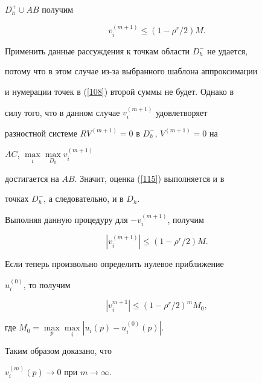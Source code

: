 \begin{pf}
$D_h^+\cup AB$ получим 


\begin{equation}\label{115}


v_{i}^{(m+1)} \leq (1 - \rho^r/2)M.


\end{equation}





Применить данные рассуждения к точкам области $D_h^-$ не удается,


потому что в этом случае из-за выбранного шаблона аппроксимации


и нумерации точек в (\ref{108}) второй суммы не будет. Однако в


силу того, что в данном случае $v_i^{(m+1)}$ удовлетворяет


разностной системе $RV^{(m+1)} = 0$ в $D_h^-$, $V^{(m+1)} = 0$ на


$AC$, $\max\limits_{i}\max\limits_{D_h} v_i^{(m+1)}$


достигается на $AB$. Значит, оценка (\ref{115}) выполняется и в


точках $D_h^-$, а следовательно, и в $D_h$.





Выполняя данную процедуру для $-v_i^{(m+1)}$, получим


$$


|v_{i}^{(m+1)}| \leq (1 - \rho^r/2)M.


$$





Если теперь произвольно определить нулевое приближение 


$u_i^{(0)}$, то получим


$$


|v_{i}^{m+1}| \leq (1 - \rho^r/2)^m M_0,


$$


где $M_0 = \max\limits_p \max\limits_i |u_i(p) - u_i^{(0)}(p)|$.





Таким образом доказано, что 


$v_i^{(m)}(p) \to 0$ при $m \to \infty$.


\end{pf}








